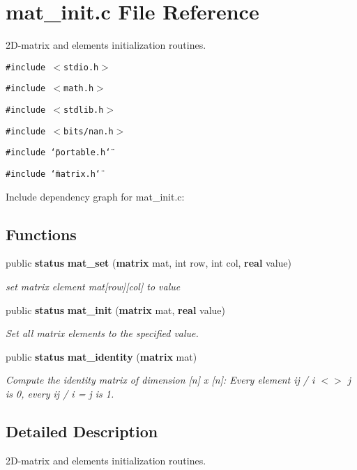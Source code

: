 \section{mat\_\-init.c File Reference}
\label{mat__init_8c}
2D-matrix and elements initialization routines. 


{\tt \#include $<$stdio.h$>$}\par
{\tt \#include $<$math.h$>$}\par
{\tt \#include $<$stdlib.h$>$}\par
{\tt \#include $<$bits/nan.h$>$}\par
{\tt \#include \char`\"{}portable.h\char`\"{}}\par
{\tt \#include \char`\"{}matrix.h\char`\"{}}\par


Include dependency graph for mat\_\-init.c:\subsection*{Functions}
\begin{CompactItemize}
\item 
public {\bf status} {\bf mat\_\-set} ({\bf matrix} mat, int row, int col, {\bf real} value)
\begin{CompactList}\small\item\em set matrix element mat[row][col] to value\item\end{CompactList}\item 
public {\bf status} {\bf mat\_\-init} ({\bf matrix} mat, {\bf real} value)
\begin{CompactList}\small\item\em Set all matrix elements to the specified value.\item\end{CompactList}\item 
public {\bf status} {\bf mat\_\-identity} ({\bf matrix} mat)
\begin{CompactList}\small\item\em Compute the identity matrix of dimension [n] x [n]: Every element ij / i $<$$>$ j is 0, every ij / i = j is 1.\item\end{CompactList}\end{CompactItemize}


\subsection{Detailed Description}
2D-matrix and elements initialization routines.




